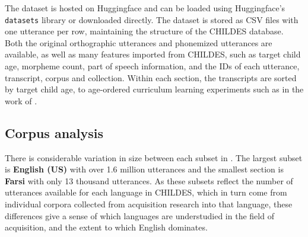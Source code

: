 The dataset is hosted on Huggingface and can be loaded using Huggingface's \texttt{datasets} library \citep{lhoest-etal-2021-datasets} or downloaded directly. The dataset is stored as CSV files with one utterance per row, maintaining the structure of the CHILDES database. Both the original orthographic utterances and phonemized utterances are available, as well as many features imported from CHILDES, such as target child age, morpheme count, part of speech information, and the IDs of each utterance, transcript, corpus and collection. Within each section, the transcripts are sorted by target child age, to age-ordered curriculum learning experiments such as in the work of \citet{huebner-etal-2021-babyberta}. 

\subsection{Corpus analysis}
\label{sec:dataset-phonemized-childes-analysis}

There is considerable variation in size between each subset in \phonemizedchildes. The largest subset is \textbf{English (US)} with over 1.6 million utterances and the smallest section is \textbf{Farsi} with only 13 thousand utterances. As these subsets reflect the number of utterances available for each language in CHILDES, which in turn come from individual corpora collected from acquisition research into that language, these differences give a sense of which languages are understudied in the field of acquisition, and the extent to which English dominates.







